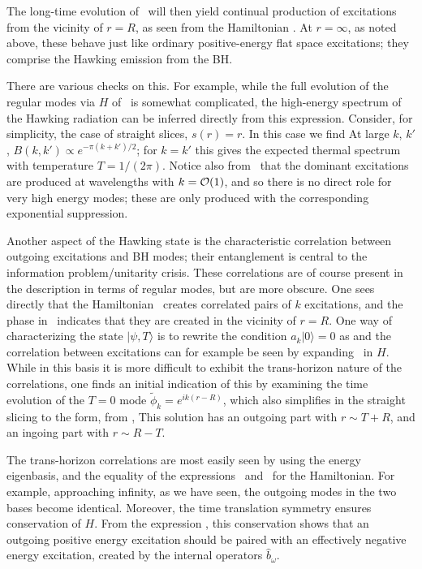  
The long-time evolution of \stateevol\ will then yield continual production of excitations from the vicinity of $r=R$, as seen from the Hamiltonian \hamreg.  At $r=\infty$, as noted above, these behave just like ordinary positive-energy flat space excitations; they comprise the Hawking emission from the BH.

There are various checks on this.  For example, while the full evolution of the regular modes via $H$ of \hamreg\ is somewhat complicated,
the high-energy spectrum of the Hawking radiation can be inferred directly from this expression.  Consider, for simplicity, the case of straight slices, $s(r)=r$.  In this case we find
%
\eqn{}
%
At large $k$, $k'$, $B(k,k')\propto e^{-\pi( k+k')/2}$; for $k=k'$ this  gives the expected thermal spectrum with temperature $T=1/(2\pi)$.  Notice also  from \Bstraight\ that the dominant excitations are produced at wavelengths with $k={\cal O}(1)$, and so there is no direct role for very high energy modes; these are only produced with the corresponding exponential suppression. 

Another aspect of the Hawking state is the characteristic correlation between outgoing excitations and BH modes; their entanglement is central to the information problem/unitarity crisis.  These correlations are of course present in the description in terms of regular modes, but are more obscure.  One sees directly that the Hamiltonian \hamreg\ creates correlated pairs of $k$ excitations, and the phase in \Bstraight\ indicates that they are created in the vicinity of $r=R$.  
One way of characterizing the state $|\psi,T\rangle$ is to rewrite the condition $a_k|0\rangle=0$ as
%
\eqn{}
%
and the correlation between excitations can for example be seen by expanding \statecond\ in $H$.  While in this basis it is more difficult to exhibit the trans-horizon nature of the correlations, one finds an initial indication of this by examining the time evolution of the $T=0$ mode $\tilde \phi_k=e^{ik(r-R)}$, which also simplifies in the straight slicing to the form, from \XtorT,
%
\eqn{}
%
This solution has an outgoing part with $r\sim T+R$, and an ingoing part with $r\sim R-T$.  


The trans-horizon correlations are most easily seen by using the energy eigenbasis, and the equality of the expressions \hamen\ and \hamreg\ for the Hamiltonian.  For example, approaching infinity, as we have seen, the outgoing modes in the two bases become identical.  Moreover, the time translation symmetry ensures conservation of $H$.  From the expression \hamen, this conservation shows that an outgoing positive energy excitation should be paired with an effectively negative energy excitation, created by the internal operators $\hat b_\omega$.  

